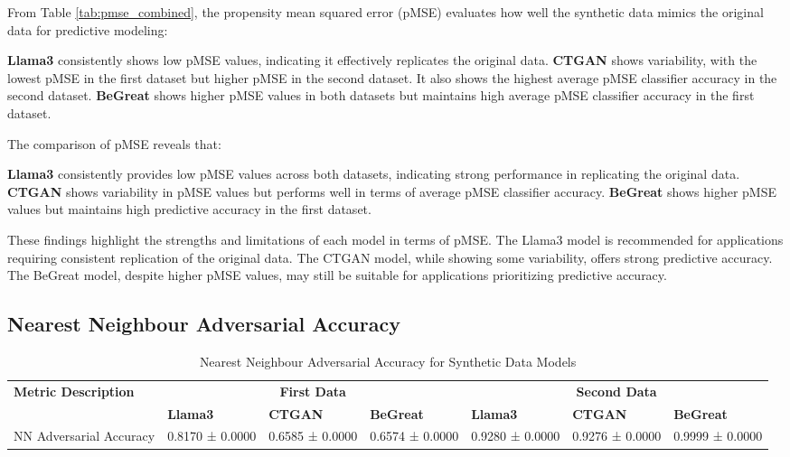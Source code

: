 From Table \ref{tab:pmse_combined}, the propensity mean squared error (pMSE) evaluates how well the synthetic data mimics the original data for predictive modeling:

\textbf{Llama3} consistently shows low pMSE values, indicating it effectively replicates the original data.
\textbf{CTGAN} shows variability, with the lowest pMSE in the first dataset but higher pMSE in the second dataset. It also shows the highest average pMSE classifier accuracy in the second dataset.
\textbf{BeGreat} shows higher pMSE values in both datasets but maintains high average pMSE classifier accuracy in the first dataset.

\vspace{0.5cm}

The comparison of pMSE reveals that:

\textbf{Llama3} consistently provides low pMSE values across both datasets, indicating strong performance in replicating the original data.
\textbf{CTGAN} shows variability in pMSE values but performs well in terms of average pMSE classifier accuracy.
\textbf{BeGreat} shows higher pMSE values but maintains high predictive accuracy in the first dataset.

\vspace{0.5cm}

These findings highlight the strengths and limitations of each model in terms of pMSE. The Llama3 model is recommended for applications requiring consistent replication of the original data. The CTGAN model, while showing some variability, offers strong predictive accuracy. The BeGreat model, despite higher pMSE values, may still be suitable for applications prioritizing predictive accuracy.







\subsection{Nearest Neighbour Adversarial Accuracy}


\begin{table}[H]
\centering
\caption{Nearest Neighbour Adversarial Accuracy for Synthetic Data Models}
\label{tab:nn_accuracy_combined}
\begin{tabularx}{\textwidth}{l*{6}{X}}
    \toprule
    \textbf{Metric Description} & \multicolumn{3}{c}{\textbf{First Data}} & \multicolumn{3}{c}{\textbf{Second Data}} \\
    \cmidrule(lr){2-4} \cmidrule(lr){5-7}
    & \textbf{Llama3} & \textbf{CTGAN} & \textbf{BeGreat} & \textbf{Llama3} & \textbf{CTGAN} & \textbf{BeGreat} \\
    \midrule
    NN Adversarial Accuracy & 0.8170 ± 0.0000 & 0.6585 ± 0.0000 & 0.6574 ± 0.0000 & 0.9280 ± 0.0000 & 0.9276 ± 0.0000 & 0.9999 ± 0.0000 \\
    \bottomrule
\end{tabularx}
\end{table}

